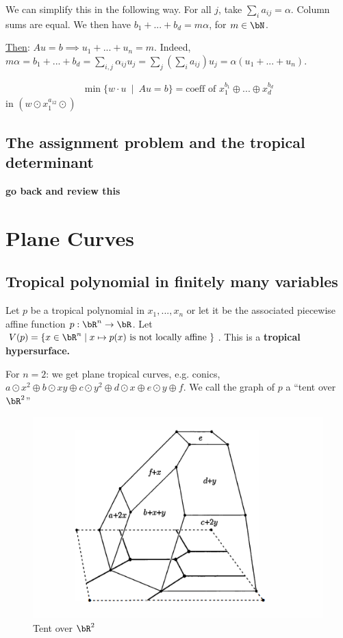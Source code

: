 We can simplify this in the following way. For all $j$, take $\sum_{i}a_{ij} = \alpha$. Column sums are equal. We then have $b_1 + ... + b_d = m\alpha$, for $m\in \bN$.

\underline{Then}: $Au = b \implies u_1 + ... + u_n = m$. Indeed, $m\alpha = b_1 + ... + b_d = \sum_{i,j} \alpha_{ij}u_j = \sum_{j}(\sum_{i}a_{ij})u_j = \alpha(u_1+...+u_n)$.

\begin{prop}\label{prop:sol-via-tropical}
  \begin{align*}
    \min\{w\cdot u ~\mid~ Au = b\} = \text{coeff of } x_1^{b_1}\oplus ... \oplus x_d^{b_d}
  \end{align*}
  in $(w\odot x_1^{a_{12}} \odot )$
\end{prop}
\subsection{The assignment problem and the tropical determinant}
\textbf{go back and review this}


\section{Plane Curves}

\subsection{Tropical polynomial in finitely many variables}

Let $p$ be a tropical polynomial in $x_1,...,x_n$ or let it be the associated piecewise affine function $p:\bR^n \to \bR$. Let $V(p) = \{x \in \bR^n \mid x \mapsto p(x) \text{ is not locally affine }\}$. This is a \textbf{tropical hypersurface.} 

For $n = 2$: we get plane tropical curves, e.g. conics, $a\odot x^{2} \oplus b\odot xy \oplus c\odot y^2 \oplus d\odot x \oplus e\odot y \oplus f$. We call the graph of $p$ a ``tent over $\bR^2$''
\begin{figure}[ht]
    \centering
	\includegraphics[width=15cm]{./figures/tent-over-R2.png}
    \caption{Tent over $\bR^2$}
    \label{fig:tent-over-R2}
\end{figure}


